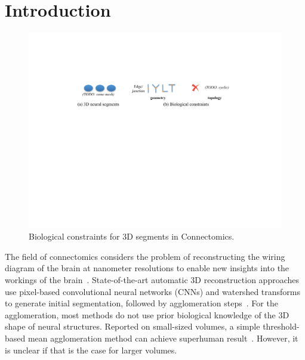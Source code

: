 \section{Introduction}

\begin{figure}[t]
	\centering
	\includegraphics[width=\linewidth]{./figures/bc/teaser_bc_v2.pdf}
	\caption{Biological constraints for 3D segments in Connectomics.}
	\label{fig:biological_constraints}
\end{figure}


The field of connectomics considers the problem of reconstructing the wiring diagram of the brain at nanometer resolutions to enable new insights into the workings of the brain~\cite{haehn2017scalable,kasthuri2015saturated}. 
State-of-the-art automatic 3D reconstruction approaches use pixel-based convolutional neural networks (CNNs) and watershed transforms to generate initial segmentation, followed by agglomeration steps~\cite{seymour2016rhoananet,lee2015recursive,nunez2014graph,parag2017anisotropic,ronneberger2015u,zlateski2015image}.
For the agglomeration, most methods do not use prior biological knowledge of the 3D shape of neural structures.
Reported on small-sized volumes, a simple threshold-based mean agglomeration method can achieve superhuman result~\cite{lee2017superhuman}.
However, it is unclear if that is the case for larger volumes.


